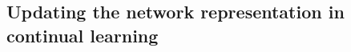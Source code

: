 \documentclass{article}
\makeatletter
\newcommand{\ie}{\textit{i.e.\@}\xspace}
\newcommand{\mbf}[1]{\mathbf{#1}}
\newcommand{\MB}{\mbf{B}}
\newcommand{\MI}{\mbf{I}}
\makeatother
\begin{document}
\subsection{Updating the network representation in continual learning}
\label{sec:cl-exp}
%
%
%
%
%
\end{document}
